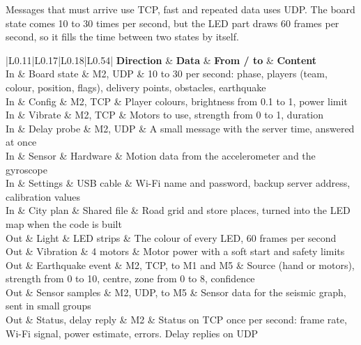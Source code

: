\documentclass[
  english,
  10pt,
  a4paper,
]{article}
\newcommand{\ckkeep}[1]{\par\noindent\begin{minipage}{\linewidth}\setlength{\parskip}{4pt}#1\end{minipage}\par\smallskip}
\begin{document}
\ckkeep{%
Messages that must arrive use TCP, fast and repeated data uses UDP. The board state comes 10 to 30 times
per second, but the LED part draws 60 frames per second, so it fills the time between two states by
itself.

\begin{tabular}{|L{0.11}|L{0.17}|L{0.18}|L{0.54}|}
\hline \textbf{Direction} & \textbf{Data} & \textbf{From / to} & \textbf{Content} \\ \hline 
In & Board state & M2, UDP & 10 to 30 per second: phase, players (team, colour, position, flags), delivery points, obstacles, earthquake \\ \hline
In & Config & M2, TCP & Player colours, brightness from 0.1 to 1, power limit \\ \hline
In & Vibrate & M2, TCP & Motors to use, strength from 0 to 1, duration \\ \hline
In & Delay probe & M2, UDP & A small message with the server time, answered at once \\ \hline
In & Sensor & Hardware & Motion data from the accelerometer and the gyroscope \\ \hline
In & Settings & USB cable & Wi-Fi name and password, backup server address, calibration values \\ \hline
In & City plan & Shared file & Road grid and store places, turned into the LED map when the code is built \\ \hline
Out & Light & LED strips & The colour of every LED, 60 frames per second \\ \hline
Out & Vibration & 4 motors & Motor power with a soft start and safety limits \\ \hline
Out & Earthquake event & M2, TCP, to M1 and M5 & Source (hand or motors), strength from 0 to 10, centre, zone from 0 to 8, confidence \\ \hline
Out & Sensor samples & M2, UDP, to M5 & Sensor data for the seismic graph, sent in small groups \\ \hline
Out & Status, delay reply & M2 & Status on TCP once per second: frame rate, Wi-Fi signal, power estimate, errors. Delay replies on UDP \\ \hline
\end{tabular}}

\end{document}
